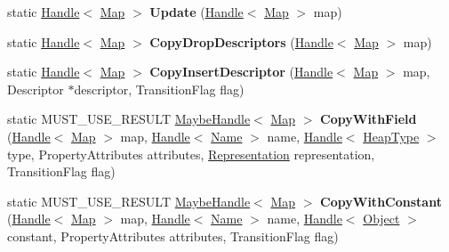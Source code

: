 \begin{DoxyCompactItemize}
\item 
\hypertarget{classv8_1_1internal_1_1_map_a42172aaf79b494c33be9747af37acd79}{}static \hyperlink{classv8_1_1internal_1_1_handle}{Handle}$<$ \hyperlink{classv8_1_1internal_1_1_map}{Map} $>$ {\bfseries Update} (\hyperlink{classv8_1_1internal_1_1_handle}{Handle}$<$ \hyperlink{classv8_1_1internal_1_1_map}{Map} $>$ map)\label{classv8_1_1internal_1_1_map_a42172aaf79b494c33be9747af37acd79}

\item 
\hypertarget{classv8_1_1internal_1_1_map_a85dabadc097b4a209f8730e102c9c416}{}static \hyperlink{classv8_1_1internal_1_1_handle}{Handle}$<$ \hyperlink{classv8_1_1internal_1_1_map}{Map} $>$ {\bfseries Copy\+Drop\+Descriptors} (\hyperlink{classv8_1_1internal_1_1_handle}{Handle}$<$ \hyperlink{classv8_1_1internal_1_1_map}{Map} $>$ map)\label{classv8_1_1internal_1_1_map_a85dabadc097b4a209f8730e102c9c416}

\item 
\hypertarget{classv8_1_1internal_1_1_map_a48ad04241966654cdd7a391cc64c2020}{}static \hyperlink{classv8_1_1internal_1_1_handle}{Handle}$<$ \hyperlink{classv8_1_1internal_1_1_map}{Map} $>$ {\bfseries Copy\+Insert\+Descriptor} (\hyperlink{classv8_1_1internal_1_1_handle}{Handle}$<$ \hyperlink{classv8_1_1internal_1_1_map}{Map} $>$ map, Descriptor $\ast$descriptor, Transition\+Flag flag)\label{classv8_1_1internal_1_1_map_a48ad04241966654cdd7a391cc64c2020}

\item 
\hypertarget{classv8_1_1internal_1_1_map_adb5af47c77f624e533b79a8eae7262cb}{}static M\+U\+S\+T\+\_\+\+U\+S\+E\+\_\+\+R\+E\+S\+U\+L\+T \hyperlink{classv8_1_1internal_1_1_maybe_handle}{Maybe\+Handle}$<$ \hyperlink{classv8_1_1internal_1_1_map}{Map} $>$ {\bfseries Copy\+With\+Field} (\hyperlink{classv8_1_1internal_1_1_handle}{Handle}$<$ \hyperlink{classv8_1_1internal_1_1_map}{Map} $>$ map, \hyperlink{classv8_1_1internal_1_1_handle}{Handle}$<$ \hyperlink{classv8_1_1internal_1_1_name}{Name} $>$ name, \hyperlink{classv8_1_1internal_1_1_handle}{Handle}$<$ \hyperlink{classv8_1_1internal_1_1_type_impl}{Heap\+Type} $>$ type, Property\+Attributes attributes, \hyperlink{classv8_1_1internal_1_1_representation}{Representation} representation, Transition\+Flag flag)\label{classv8_1_1internal_1_1_map_adb5af47c77f624e533b79a8eae7262cb}

\item 
\hypertarget{classv8_1_1internal_1_1_map_abd8b707bb91975d044d1576026983700}{}static M\+U\+S\+T\+\_\+\+U\+S\+E\+\_\+\+R\+E\+S\+U\+L\+T \hyperlink{classv8_1_1internal_1_1_maybe_handle}{Maybe\+Handle}$<$ \hyperlink{classv8_1_1internal_1_1_map}{Map} $>$ {\bfseries Copy\+With\+Constant} (\hyperlink{classv8_1_1internal_1_1_handle}{Handle}$<$ \hyperlink{classv8_1_1internal_1_1_map}{Map} $>$ map, \hyperlink{classv8_1_1internal_1_1_handle}{Handle}$<$ \hyperlink{classv8_1_1internal_1_1_name}{Name} $>$ name, \hyperlink{classv8_1_1internal_1_1_handle}{Handle}$<$ \hyperlink{classv8_1_1internal_1_1_object}{Object} $>$ constant, Property\+Attributes attributes, Transition\+Flag flag)\label{classv8_1_1internal_1_1_map_abd8b707bb91975d044d1576026983700}


\end{DoxyCompactItemize}
